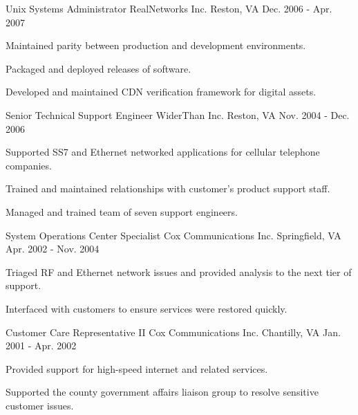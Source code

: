 \begin{cventries}
  \cventry
    {Unix Systems Administrator} %
    {RealNetworks Inc.} %
    {Reston, VA} %
    {Dec. 2006 - Apr. 2007} %
    {
      \begin{cvitems} %
        \item {Maintained parity between production and development environments.}
        \item {Packaged and deployed releases of software.}
        \item {Developed and maintained CDN verification framework for digital assets.}
      \end{cvitems}
    }

  \cventry
    {Senior Technical Support Engineer} %
    {WiderThan Inc.} %
    {Reston, VA} %
    {Nov. 2004 - Dec. 2006} %
    {
      \begin{cvitems} %
        \item {Supported SS7 and Ethernet networked applications for cellular telephone companies.}
        \item {Trained and maintained relationships with customer's product support staff.}
        \item {Managed and trained team of seven support engineers.}
      \end{cvitems}
    }

  \cventry
    {System Operations Center Specialist} %
    {Cox Communications Inc.} %
    {Springfield, VA} %
    {Apr. 2002 - Nov. 2004} %
    {
      \begin{cvitems} %
        \item {Triaged RF and Ethernet network issues and provided analysis to the next tier of support.}
        \item {Interfaced with customers to ensure services were restored quickly.}
      \end{cvitems}
    }

  \cventry
    {Customer Care Representative II} %
    {Cox Communications Inc.} %
    {Chantilly, VA} %
    {Jan. 2001 - Apr. 2002} %
    {
      \begin{cvitems} %
        \item {Provided support for high-speed internet and related services.}
        \item {Supported the county government affairs liaison group to resolve sensitive customer issues.}
      \end{cvitems}
    }


\end{cventries}
